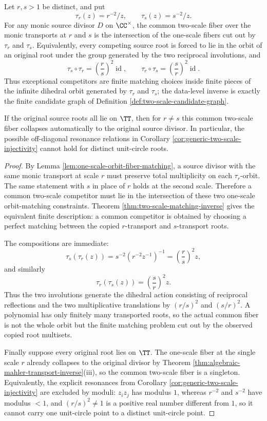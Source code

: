 \begin{corollary}\label{cor:dihedral-common-fiber}
Let \(r,s>1\) be distinct, and put
\[
\tau_r(z)=r^{-2}/z,\qquad \tau_s(z)=s^{-2}/z .
\]
For any monic source divisor \(D\) on \(\CC^\times\), the common
two-scale fiber over the monic transports at \(r\) and \(s\) is the
intersection of the one-scale fibers cut out by \(\tau_r\) and
\(\tau_s\).  Equivalently, every competing source root is forced to
lie in the orbit of an original root under the group generated by the
two reciprocal involutions, and
\[
\tau_s\circ\tau_r=\left(\frac r s\right)^2\operatorname{id},
\qquad
\tau_r\circ\tau_s=\left(\frac s r\right)^2\operatorname{id}.
\]
Thus exceptional competitors are finite matching choices inside
finite pieces of the infinite dihedral orbit generated by
\(\tau_r\) and \(\tau_s\); the data-level inverse is exactly the finite
candidate graph of Definition \ref{def:two-scale-candidate-graph}.

If the original source roots all lie on \(\TT\), then for \(r\ne s\)
this common two-scale fiber collapses automatically to the original
source divisor.  In particular, the possible off-diagonal resonance
relations in Corollary \ref{cor:generic-two-scale-injectivity} cannot
hold for distinct unit-circle roots.
\end{corollary}

\begin{proof}
By Lemma \ref{lem:one-scale-orbit-fiber-matching}, a source divisor
with the same monic transport at scale \(r\) must preserve total
multiplicity on each \(\tau_r\)-orbit.  The same statement with \(s\)
in place of \(r\) holds at the second scale.  Therefore a common
two-scale competitor must lie in the intersection of these two
one-scale orbit-matching constraints.  Theorem
\ref{thm:two-scale-matching-inverse} gives the equivalent finite
description: a common competitor is obtained by choosing a perfect
matching between the copied \(r\)-transport and \(s\)-transport roots.

The compositions are immediate:
\[
\tau_s(\tau_r(z))
=s^{-2}\left(r^{-2}z^{-1}\right)^{-1}
=\left(\frac r s\right)^2z,
\]
and similarly
\[
\tau_r(\tau_s(z))=\left(\frac s r\right)^2z.
\]
Thus the two involutions generate the dihedral action consisting of
reciprocal reflections and the two multiplicative translations by
\((r/s)^2\) and \((s/r)^2\).  A polynomial has only finitely many
transported roots, so the actual common fiber is not the whole orbit
but the finite matching problem cut out by the observed copied root
multisets.

Finally suppose every original root lies on \(\TT\).  The one-scale
fiber at the single scale \(r\) already collapses to the original
divisor by Theorem
\ref{thm:algebraic-mahler-transport-inverse}\textup{(iii)}, so the
common two-scale fiber is a singleton.  Equivalently, the explicit
resonances from Corollary \ref{cor:generic-two-scale-injectivity} are
excluded by moduli: \(z_i z_j\) has modulus \(1\), whereas
\(r^{-2}\) and \(s^{-2}\) have modulus \(<1\), and
\((r/s)^2\ne1\) is a positive real number different from \(1\), so it
cannot carry one unit-circle point to a distinct unit-circle point.
\end{proof}

